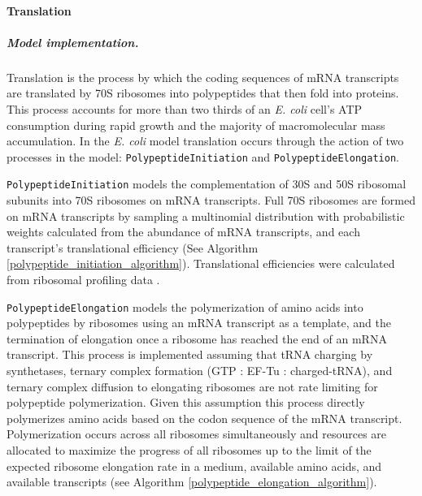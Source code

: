 \documentclass[12pt]{article}
\begin{document}
\baselineskip24pt

\paragraph{Translation}

\subparagraph{Model implementation.}
Translation is the process by which the coding sequences of mRNA transcripts are translated by 70S ribosomes into polypeptides that then fold into proteins. This process accounts for more than two thirds of an \emph{E. coli} cell's ATP consumption during rapid growth \cite{Russell:1995vc} and the majority of macromolecular mass accumulation. In the \emph{E. coli} model  translation occurs through the action of two processes in the model: \texttt{PolypeptideInitiation} and \texttt{PolypeptideElongation}.

\texttt{PolypeptideInitiation} models the complementation of 30S and 50S ribosomal subunits into 70S ribosomes on mRNA transcripts. Full 70S ribosomes are formed on mRNA transcripts by sampling a multinomial distribution with probabilistic weights calculated from the abundance of mRNA transcripts, and each transcript's translational efficiency (See Algorithm \ref{polypeptide_initiation_algorithm}). Translational efficiencies were calculated from ribosomal profiling data \cite{li2014quantifying}.

\texttt{PolypeptideElongation} models the polymerization of amino acids into polypeptides by ribosomes using an mRNA transcript as a template, and the termination of elongation once a ribosome has reached the end of an mRNA transcript. This process is implemented assuming that tRNA charging by synthetases, ternary complex formation (GTP : EF-Tu : charged-tRNA), and ternary complex diffusion to elongating ribosomes are not rate limiting for polypeptide polymerization. Given this assumption this process directly polymerizes amino acids based on the codon sequence of the mRNA transcript. Polymerization occurs across all ribosomes simultaneously and resources are allocated to maximize the progress of all ribosomes up to the limit of the expected ribosome elongation rate in a medium, available amino acids, and available transcripts (see Algorithm \ref{polypeptide_elongation_algorithm}). \\
\end{document}
